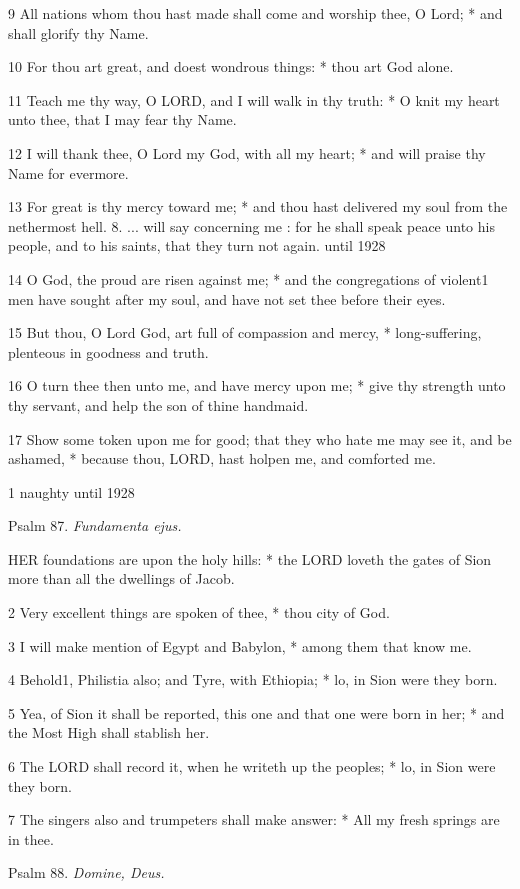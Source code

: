 9 All nations whom thou hast made shall come and worship
thee, O Lord; * and shall glorify thy Name.

10 For thou art great, and doest wondrous things: *
thou art God alone.

11 Teach me thy way, O LORD, and I will walk in thy
truth: * O knit my heart unto thee, that I may fear thy Name.

12 I will thank thee, O Lord my God, with all my heart;
* and will praise thy Name for evermore.

13 For great is thy mercy toward me; * and thou hast
delivered my soul from the nethermost hell. 8. ... will say concerning
me : for he shall speak peace unto his people, and to his saints, that they
turn not again.
until 1928

14 O God, the proud are risen against me; * and the congregations of violent1
men have sought after my soul, and have not set thee before their eyes.

15 But thou, O Lord God, art full of compassion and
mercy, * long-suffering, plenteous in goodness and truth.

16 O turn thee then unto me, and have mercy upon me;
* give thy strength unto thy servant, and help the son of thine handmaid.

17 Show some token upon me for good; that they who
hate me may see it, and be ashamed, * because thou, LORD, hast holpen
me, and comforted me.

1 naughty
until 1928

Psalm
87. \emph{Fundamenta ejus.}

HER
foundations are upon the holy hills: * the LORD loveth the gates of Sion
more than all the dwellings of Jacob.

2 Very excellent things are spoken of thee, * thou
city of God.

3 I will make mention of Egypt and Babylon, * among them that know me.

4 Behold1, Philistia also; and Tyre, with
Ethiopia; * lo, in Sion were they born.

5 Yea, of Sion it shall be reported, this one and that
one were born in her; * and the Most High shall stablish her.

6 The LORD shall record it, when he writeth up the
peoples; * lo, in Sion were they born.

7 The singers also and trumpeters shall make answer:
* All my fresh springs are in thee.

Psalm
88. \emph{Domine, Deus.}

